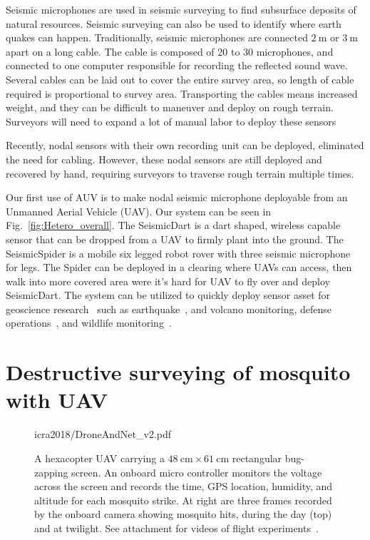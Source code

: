 Seismic microphones are used in seismic surveying to find subsurface deposits of natural resources.
Seismic surveying can also be used to identify where earth quakes can happen.
Traditionally, seismic microphones are connected $\SI{2}{\metre}$ or $\SI{3}{\metre}$ apart on a long cable.
The cable is composed of 20 to 30 microphones, and connected to one computer responsible for recording the reflected sound wave.
Several cables can be laid out to cover the entire survey area, so length of cable required is proportional to survey area.
Transporting the cables means increased weight, and they can be difficult to maneuver and deploy on rough terrain.
Surveyors will need to expand a lot of manual labor to deploy these sensors

Recently, nodal sensors with their own recording unit can be deployed, eliminated the need for cabling.
However, these nodal sensors are still deployed and recovered by hand, requiring surveyors to traverse rough terrain multiple times.

Our first use of AUV is to make nodal seismic microphone deployable from an Unmanned Aerial Vehicle (UAV).
Our system can be seen in Fig.~\ref{fig:Hetero_overall}.
The SeismicDart is a dart shaped, wireless capable sensor that can be dropped from a UAV to firmly plant into the ground.
The SeismicSpider is a mobile six legged robot rover with three seismic microphone for legs.
The Spider can be deployed in a clearing where UAVs can access, then walk into more covered area were it's hard for UAV to fly over and deploy SeismicDart.
The system can be utilized to quickly deploy sensor asset for geoscience research~\cite{werner2006deploying} such as
earthquake~\cite{dominici2012micro},
and volcano \cite{nagatani2013volcanic} monitoring,
defense operations~\cite{wu2007efficient},
and wildlife monitoring~\cite{dyo2010evolution,mainwaring2002wireless}. 

\section[Mosquito AUV]{Destructive surveying of mosquito with UAV}

\begin{figure}
	\centering
	\begin{overpic}[width=1\columnwidth]{icra2018/DroneAndNet_v2.pdf}\end{overpic}
	\caption{\label{fig:DroneAndNet}
		A hexacopter UAV carrying a $\SI{48}{\centi\metre} \times \SI{61}{\centi\metre}$ rectangular bug-zapping screen.
		An onboard micro controller monitors the voltage across the screen and records the time, GPS location, humidity, and altitude for each mosquito strike.
		At right are three frames recorded by the onboard camera showing mosquito hits, during the day (top) and at twilight.
		See attachment for videos of flight experiments~\cite{Bhatnagar2018}.
	\vspace{-2em}
	}
\end{figure}

